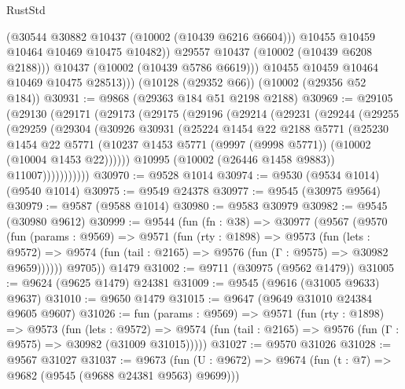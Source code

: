 \begin{lexlean}{RustStd}
\begin{coremodule}
                  (@30544 @30882 @10437 (@10002 (@10439 @6216 @6604)))
                  @10455
                  @10459
                  @10464
                  @10469
                  @10475
                  @10482))
              @29557
              @10437
              (@10002 (@10439 @6208 @2188)))
            @10437
            (@10002 (@10439 @5786 @6619)))
          @10455
          @10459
          @10464
          @10469
          @10475
          @28513)))
    (@10128 (@29352 @66))
    (@10002 (@29356 @52 @184))
@30931 := @9868 (@29363 @184 @51 @2198 @2188)
@30969 := @29105
    (@29130
      (@29171
        (@29173
          (@29175
            (@29196
              (@29214
                (@29231
                  (@29244
                    (@29255
                      (@29259
                        (@29304
                          (@30926
                            @30931
                            (@25224
                              @1454
                              @22
                              @2188
                              @5771
                              (@25230
                                @1454
                                @22
                                @5771
                                (@10237
                                  @1453
                                  @5771
                                  (@9997 (@9998 @5771))
                                  (@10002 (@10004 @1453 @22))))))
                          @10995
                          (@10002 (@26446 @1458 @9883))
                          @11007)))))))))))
@30970 := @9528 @1014
@30974 := @9530 (@9534 @1014) (@9540 @1014)
@30975 := @9549 @24378
@30977 := @9545 (@30975 @9564)
@30979 := @9587 (@9588 @1014)
@30980 := @9583 @30979
@30982 := @9545 (@30980 @9612)
@30999 := @9544
    (fun (fn : @38) =>
    @30977
      (@9567
        (@9570
          (fun (params : @9569) =>
          @9571
            (fun (rty : @1898) =>
            @9573
              (fun (lets : @9572) =>
              @9574 (fun (tail : @2165) => @9576 (fun (Γ : @9575) => @30982 @9659))))))
        @9705))
    @1479
@31002 := @9711 (@30975 (@9562 @1479))
@31005 := @9624 (@9625 @1479) @24381
@31009 := @9545 (@9616 (@31005 @9633) @9637)
@31010 := @9650 @1479
@31015 := @9647 (@9649 @31010 @24384 @9605 @9607)
@31026 := fun (params : @9569) =>
  @9571
    (fun (rty : @1898) =>
    @9573
      (fun (lets : @9572) =>
      @9574 (fun (tail : @2165) => @9576 (fun (Γ : @9575) => @30982 (@31009 @31015)))))
@31027 := @9570 @31026
@31028 := @9567 @31027
@31037 := @9673
    (fun (U : @9672) => @9674 (fun (t : @7) => @9682 (@9545 (@9688 @24381 @9563) @9699)))

\end{coremodule}
\end{lexlean}
